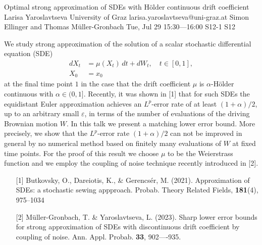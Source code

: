 \begin{talk}
  {Optimal strong approximation of SDEs with H\"older continuous drift coefficient}%
  {Larisa Yaroslavtseva}%
  {University of Graz}%
  {larisa.yaroslavtseva@uni-graz.at}%
  {Simon Ellinger and Thomas M\"uller-Gronbach}%
  {}%
  {Tue, Jul 29 15:30---16:00}%
  {S12-1}%
  {S12}%
  
    
   
We study strong approximation of the solution of a scalar stochastic differential equation (SDE)
\begin{equation}\label{sde0}
 \begin{aligned}
  dX_t & = \mu(X_t) \, dt +  dW_t, \quad t\in [0,1],\\
  X_0 & = x_0
 \end{aligned}
\end{equation}
at the final time point $1$
in the case that  the drift coefficient  $\mu$ is $\alpha$-H\"older continuous with $\alpha\in(0, 1]$.
Recently, it was  shown in [1] that for such SDEs the equidistant Euler approximation achieves an $L^p$-error rate of at least $(1+\alpha)/2$, up to an arbitrary small $\varepsilon$,
in terms of the number of evaluations of the driving Brownian motion $W$.
In this talk  we  
present a matching  lower error bound.   More precisely, we show that
the $L^p$-error rate $(1+\alpha)/2$ can
not be improved in general by  no numerical 
method based on finitely many evaluations of $W$ at fixed time points. For the proof of this result we choose  $\mu$ to be the Weierstrass function and we employ  the coupling of noise technique  recently introduced in [2].




\begin{enumerate}
 \item[{[1]}] Butkovsky, O., Dareiotis, K., \& Gerencs\'er, M. (2021). Approximation of SDEs: a stochastic sewing appproach. Probab. Theory Related Fields, \textbf{181}(4), 975--1034
 \item[{[2]}] M\"uller-Gronbach, T.  \& Yaroslavtseva, L. (2023). Sharp lower error bounds for strong approximation of
 SDEs with discontinuous drift coefficient by coupling of noise. Ann. Appl. Probab. \textbf{33}, 902----935.
\end{enumerate}


\end{talk}

